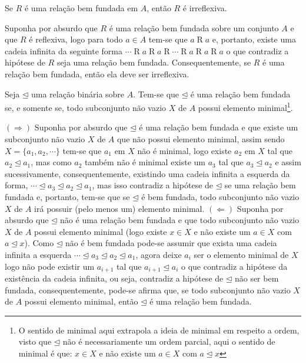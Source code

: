 \begin{proposicao}\label{prop:IrreflexividadeDaRelacaoBemFundada}
	Se $R$ é uma relação bem fundada em $A$, então $R$ é irreflexiva.
\end{proposicao}

\begin{prova}
	Suponha por absurdo que $R$ é uma relação bem fundada sobre um conjunto $A$ e que $R$ é reflexiva, logo para todo $a \in A$ tem-se que $a \mathrel{R} a$ e, portanto, existe uma cadeia infinita da seguinte forma $\cdots \mathrel{R} a \mathrel{R} a\mathrel{R} \cdots \mathrel{R} a \mathrel{R} a \mathrel{R} a$ o que contradiz a hipótese de $R$ seja uma relação bem fundada. Consequentemente, se $R$ é uma relação bem fundada, então ela deve ser irreflexiva.
\end{prova}

\begin{teorema}\label{teo:CaracterizacaoRelacaoBemFundada}
	Seja $\unlhd$ uma relação binária sobre $A$. Tem-se que $\unlhd$ é uma relação bem fundada se, e somente se, todo subconjunto não vazio $X$ de $A$ possui elemento minimal\footnote{O sentido de minimal aqui extrapola a ideia de minimal em respeito a ordem, visto que $\unlhd$ não é necessariamente um ordem parcial, aqui o sentido de minimal é que: $x \in X$ e não existe um $a \in X$ com $a \unlhd x$}.
\end{teorema}

\begin{prova}
	$(\Rightarrow)$ Suponha por absurdo que $\unlhd$ é uma relação bem fundada  e que existe um subconjunto não vazio $X$ de $A$ que não possui elemento minimal, assim sendo $X = \{a_1, a_2, \cdots\}$ tem-se que $a_1$ em $X$ não é minimal, logo existe $a_2$ em $X$ tal que $a_2 \unlhd a_1$, mas como $a_2$ também não é minimal existe um $a_3$ tal que $a_3 \unlhd a_2$ e assim sucessivamente, consequentemente, existindo uma cadeia infinita a esquerda da forma, $\cdots \unlhd a_3 \unlhd a_2 \unlhd a_1$, mas isso contradiz a hipótese de $\unlhd$ se uma relação bem fundada e, portanto, tem-se que se $\unlhd$ é bem fundada, todo subconjunto não vazio $X$ de $A$ irá possuir (pelo menos um) elemento minimal. $(\Leftarrow)$ Suponha por absurdo que $\unlhd$ não é uma relação bem fundada e que todo subconjunto não vazio $X$ de $A$ possui elemento minimal (logo existe $x \in X$ e não existe um $a \in X$ com $a \unlhd x$). Como $\unlhd$ não é bem fundada pode-se assumir que exista uma cadeia infinita a esquerda $\cdots \unlhd a_3 \unlhd a_2 \unlhd a_1$, agora deixe $a_i$ ser o elemento minimal de $X$ logo não pode existir um $a_{i+1}$ tal que $a_{i+1} \unlhd a_i$ o que contradiz a hipótese da existência da cadeia infinita, ou seja, contradiz a hipótese de $\unlhd$ não ser bem fundada, consequentemente, pode-se afirma que, se  todo subconjunto não vazio $X$ de $A$ possui elemento minimal, então $\unlhd$ é uma relação bem fundada.
\end{prova}

